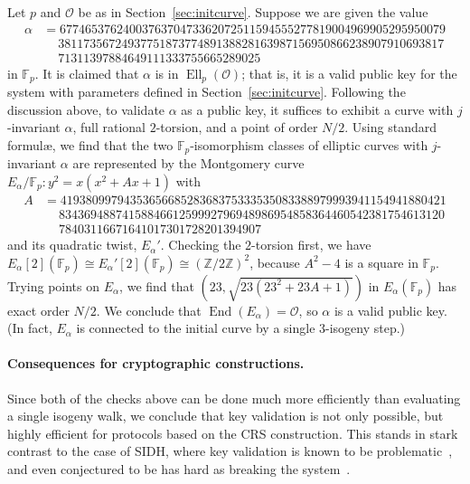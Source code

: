 \documentclass{llncs}
\newcommand{\F}{\mathbb{F}}
\newcommand{\Z}{\mathbb{Z}}
\renewcommand{\O}{\mathcal{O}}
\DeclareMathOperator{\End}{End}
\DeclareMathOperator{\Ell}{Ell}
\begin{document}
\begin{example}
    Let $p$ and $\O$ be as in Section~\ref{sec:initcurve}.
    Suppose we are given the value
    \begin{align*}
        \alpha & = 
        6774653762400376370473362072511594555277819004969905295950079
        \\
        & \quad\ 
        3811735672493775187377489138828163987156950866238907910693817
        \\
        & \quad\ 
        71311397884649111333755665289025
    \end{align*}
    in $\F_p$.  It is claimed that $\alpha$ is in $\Ell_p(\O)$;
    that is, it is a valid public key for the system with parameters
    defined in Section~\ref{sec:initcurve}.
    Following the discussion above,
    to validate $\alpha$ as a public key,
    it suffices to exhibit a curve with $j$-invariant $\alpha$,
    full rational $2$-torsion,
    and a point of order $N/2$.
    Using standard formul\ae{},
    we find that the two $\F_p$-isomorphism classes of elliptic curves
    with $j$-invariant $\alpha$
    are represented by the Montgomery curve
    $E_\alpha/\F_p: y^2 = x(x^2 + Ax + 1)$
    with
    \begin{align*}
        A & = 
        4193809979435365668528368375333535083388979993941154941880421
        \\
        & \quad\ 
        8343694887415884661259992796948986954858364460542381754613120
        \\
        & \quad\ 
        78403116671641017301728201394907
    \end{align*}
    and its quadratic twist, $E_\alpha'$.
    Checking the $2$-torsion first,
    we have $E_\alpha[2](\F_p) \cong E_\alpha'[2](\F_p) \cong (\Z/2\Z)^2$,
    because $A^2 - 4$ is a square in $\F_p$.
    Trying points on $E_\alpha$,
    we find that $(23,\sqrt{23(23^2 + 23A + 1)})$ in $E_\alpha(\F_p)$
    has exact order $N/2$.
    We conclude that $\End(E_\alpha) = \O$,
    so $\alpha$ is a valid public key.
    (In fact, $E_\alpha$ is connected to the initial curve
    by a single $3$-isogeny step.)
\end{example}

\paragraph{Consequences for cryptographic constructions.}
Since both of the checks above can be done much more efficiently 
than evaluating a single isogeny walk, 
we conclude that key validation is not only possible,
but highly efficient for protocols based on the CRS construction. 
This stands in stark contrast to the case of SIDH,
where key validation is known to be
problematic~\cite{galbraithsecurity}, and even conjectured to be has
hard as breaking the system~\cite{cryptoeprint:2018:336}.
\end{document}
